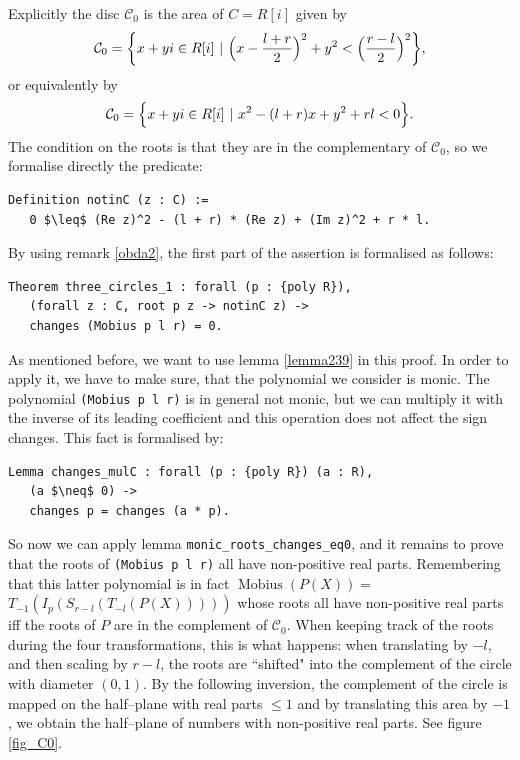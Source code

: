 \documentclass[11pt, a4paper]{article}
\DeclareMathOperator{\Mob}{M{o}bius}
\newcommand{\ssc}{{\mathcal C}}
\begin{document}
Explicitly the disc $\ssc_0$ is the area of $C=R[i]$ given by 
\[\ssc_0 = \biggl\{x + yi \in R[i] \phantom{i} | \phantom{i} \Bigl(x - \frac{l+r}{2} \Bigr)^2 + y^2 < \Bigl(\frac{r-l}{2} \Bigr)^2 \biggr\},\]
or equivalently by
\[\ssc_0 = \Bigl\{x + yi \in R[i] \phantom{i} | \phantom{i} x^2 - (l + r)x + y^2 + rl < 0\Bigr\}.\]
The condition on the roots is that they are in the complementary of $\ssc_0$, so we formalise directly the predicate:
\begin{lstlisting}
Definition notinC (z : C) :=
   0 $\leq$ (Re z)^2 - (l + r) * (Re z) + (Im z)^2 + r * l.
\end{lstlisting}
By using remark \ref{obda2}, the first part of the assertion is formalised as follows:
\begin{lstlisting}
Theorem three_circles_1 : forall (p : {poly R}),
   (forall z : C, root p z -> notinC z) ->
   changes (Mobius p l r) = 0.
\end{lstlisting}
As mentioned before, we want to use lemma \ref{lemma239} in this proof. In order to apply it, we have to make sure, that the polynomial we consider is monic. The polynomial \lstinline!(Mobius p l r)! is in general not monic, but we can multiply it with the inverse of its leading coefficient and this operation does not affect the sign changes. This fact is formalised by:
\begin{lstlisting}
Lemma changes_mulC : forall (p : {poly R}) (a : R),
   (a $\neq$ 0) ->
   changes p = changes (a * p).
\end{lstlisting}
So now we can apply lemma \lstinline!monic_roots_changes_eq0!, and it remains to prove that the roots of \lstinline!(Mobius p l r)! all have non-positive real parts. Remembering that this latter polynomial is in fact $\Mob(P(X)) =$\\ $T_{-1} (I_p (S_{r-l} (T_{-l}(P(X)))))$ whose roots all have non-positive real parts iff the roots of $P$ are in the complement of $\ssc_0$. When keeping track of the roots during the four transformations, this is what happens: when translating by $-l$, and then scaling by $r-l$, the roots are ``shifted" into the complement of the circle with diameter $(0,1)$. By the following inversion, the complement of the circle is mapped on the half--plane with real parts $\leq 1$ and by translating this area by $-1$, we obtain the half--plane of numbers with non-positive real parts. See figure \ref{fig_C0}.
\end{document}
